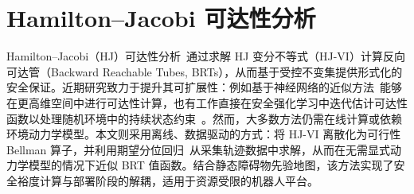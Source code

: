 \section{Hamilton–Jacobi 可达性分析}

Hamilton–Jacobi（HJ）可达性分析~\cite{bansal2017hj_reachability}通过求解 HJ 变分不等式（HJ-VI）计算反向可达管（Backward Reachable Tubes, BRTs），从而基于受控不变集提供形式化的安全保证。近期研究致力于提升其可扩展性：例如基于神经网络的近似方法~\cite{bansal2021deepreach,hsu2021safety,so2024neural_cbf}能够在更高维空间中进行可达性计算，也有工作直接在安全强化学习中迭代估计可达性函数以处理随机环境中的持续状态约束~\cite{ganai2023iterative_reachability}。然而，大多数方法仍需在线计算或依赖环境动力学模型。本文则采用离线、数据驱动的方式：将 HJ-VI 离散化为可行性 Bellman 算子，并利用期望分位回归~\cite{kostrikov2022iql}从采集轨迹数据中求解，从而在无需显式动力学模型的情况下近似 BRT 值函数。结合静态障碍物先验地图，该方法实现了安全裕度计算与部署阶段的解耦，适用于资源受限的机器人平台。







